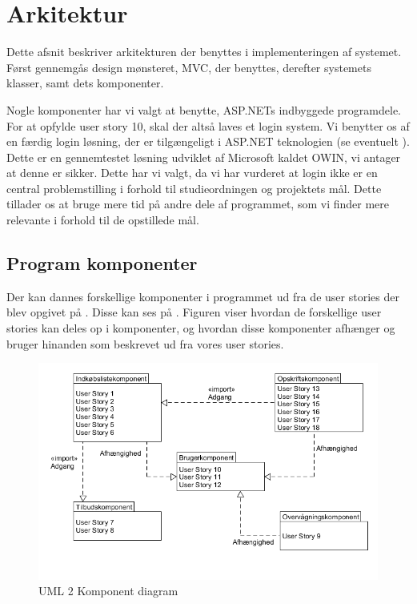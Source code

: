 \section{Arkitektur}
Dette afsnit beskriver arkitekturen der benyttes i implementeringen af systemet.
Først gennemgås design mønsteret, MVC, der benyttes, derefter systemets klasser, samt dets komponenter.

Nogle komponenter har vi valgt at benytte, ASP.NETs indbyggede programdele. 
For at opfylde user story 10, skal der altså laves et login system.
Vi benytter os af en færdig login løsning, der er tilgængeligt i ASP.NET teknologien (se eventuelt ).
Dette er en gennemtestet løsning udviklet af Microsoft kaldet OWIN, vi antager at denne er sikker.
Dette har vi valgt, da vi har vurderet at login ikke er en central problemstilling i forhold til studieordningen og projektets mål.
Dette tillader os at bruge mere tid på andre dele af programmet, som vi finder mere relevante i forhold til de opstillede mål.



\subsection{Program komponenter}\label{subsec:komp}

Der kan dannes forskellige komponenter i programmet ud fra de user stories der blev opgivet på .
Disse kan ses på .
Figuren viser hvordan de forskellige user stories kan deles op i komponenter, og hvordan disse komponenter afhænger og bruger hinanden som beskrevet ud fra vores user stories.

\begin{figure}
	\vspace{-20pt}
	\begin{center}
		\includegraphics[scale=0.6]{images/Diagrams/Komponenter.png}
	\end{center}
	\vspace{-20pt}
	\caption{UML 2 Komponent diagram }
	\label{figure:komp}
	\vspace{-20pt}
\end{figure}

